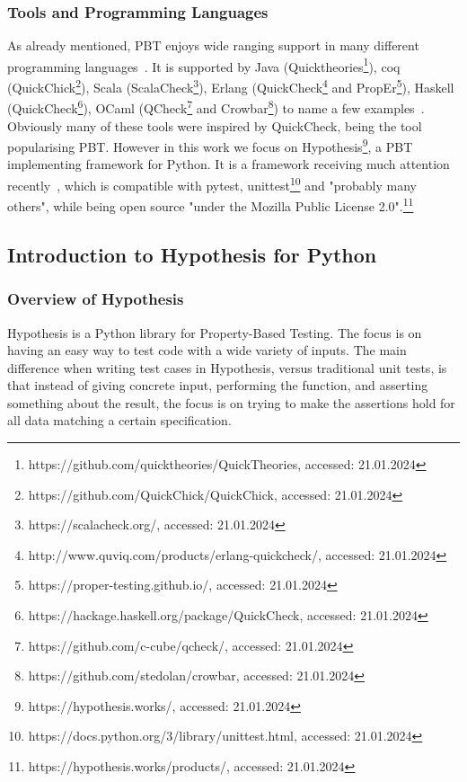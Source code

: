 \documentclass[runningheads]{llncs}
\begin{document}
\subsubsection{Tools and Programming Languages}
As already mentioned, PBT enjoys wide ranging support in many different programming languages~\cite{Chen2022,Shi2023}. It is supported by Java (Quicktheories\footnote{https://github.com/quicktheories/QuickTheories, accessed: 21.01.2024}), coq (QuickChick\footnote{https://github.com/QuickChick/QuickChick, accessed: 21.01.2024}), Scala (ScalaCheck\footnote{https://scalacheck.org/, accessed: 21.01.2024}), Erlang (QuickCheck\footnote{http://www.quviq.com/products/erlang-quickcheck/, accessed: 21.01.2024} and PropEr\footnote{https://proper-testing.github.io/, accessed: 21.01.2024}), Haskell (QuickCheck\footnote{https://hackage.haskell.org/package/QuickCheck, accessed: 21.01.2024}), OCaml (QCheck\footnote{https://github.com/c-cube/qcheck/, accessed: 21.01.2024} and Crowbar\footnote{https://github.com/stedolan/crowbar, accessed: 21.01.2024}) to name a few examples~\cite{MacIver2016,Padhye2019,Paraskevopoulou2015,Arts2008,Papadakis2011,Claessen2000}. Obviously many of these tools were inspired by QuickCheck, being the tool popularising PBT. However in this work we focus on Hypothesis\footnote{https://hypothesis.works/, accessed: 21.01.2024}, a PBT implementing framework for Python. It is a framework receiving much attention recently~\cite{Corgozinho2023,MacIver2019}, which is compatible with pytest, unittest\footnote{https://docs.python.org/3/library/unittest.html, accessed: 21.01.2024} and "probably many others", while being open source "under the Mozilla Public License 2.0".\footnote{https://hypothesis.works/products/, accessed: 21.01.2024}

\subsection{Introduction to Hypothesis for Python}
\subsubsection{Overview of Hypothesis}
Hypothesis is a Python library for Property-Based Testing. The focus is on having an easy way to test code with a wide variety of inputs. The main difference when writing test cases in Hypothesis, versus traditional unit tests, is that instead of
giving concrete input, performing the function, and asserting something about the result, the focus is on trying to make the assertions hold for all data matching a certain specification.
\end{document}

